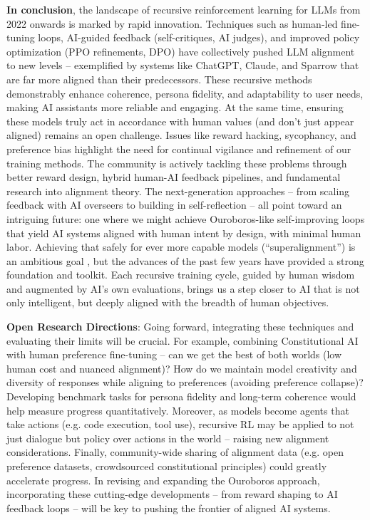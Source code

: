 \documentclass{article}
\begin{document}
\textbf{In conclusion}, the landscape of recursive reinforcement learning for LLMs from 2022 onwards is marked by rapid innovation. Techniques such as human-led fine-tuning loops, AI-guided feedback (self-critiques, AI judges), and improved policy optimization (PPO refinements, DPO) have collectively pushed LLM alignment to new levels – exemplified by systems like ChatGPT, Claude, and Sparrow that are far more aligned than their predecessors. These recursive methods demonstrably enhance coherence, persona fidelity, and adaptability to user needs, making AI assistants more reliable and engaging. At the same time, ensuring these models truly act in accordance with human values (and don’t just appear aligned) remains an open challenge. Issues like reward hacking, sycophancy, and preference bias highlight the need for continual vigilance and refinement of our training methods. The community is actively tackling these problems through better reward design, hybrid human-AI feedback pipelines, and fundamental research into alignment theory. The next-generation approaches – from scaling feedback with AI overseers to building in self-reflection – all point toward an intriguing future: one where we might achieve Ouroboros-like self-improving loops that yield AI systems aligned with human intent by design, with minimal human labor. Achieving that safely for ever more capable models (“superalignment”) is an ambitious goal  , but the advances of the past few years have provided a strong foundation and toolkit. Each recursive training cycle, guided by human wisdom and augmented by AI’s own evaluations, brings us a step closer to AI that is not only intelligent, but deeply aligned with the breadth of human objectives.

\textbf{Open Research Directions}: Going forward, integrating these techniques and evaluating their limits will be crucial. For example, combining Constitutional AI with human preference fine-tuning – can we get the best of both worlds (low human cost and nuanced alignment)? How do we maintain model creativity and diversity of responses while aligning to preferences (avoiding preference collapse)? Developing benchmark tasks for persona fidelity and long-term coherence would help measure progress quantitatively. Moreover, as models become agents that take actions (e.g. code execution, tool use), recursive RL may be applied to not just dialogue but policy over actions in the world – raising new alignment considerations. Finally, community-wide sharing of alignment data (e.g. open preference datasets, crowdsourced constitutional principles) could greatly accelerate progress. In revising and expanding the Ouroboros approach, incorporating these cutting-edge developments – from reward shaping to AI feedback loops – will be key to pushing the frontier of aligned AI systems.
\end{document}
